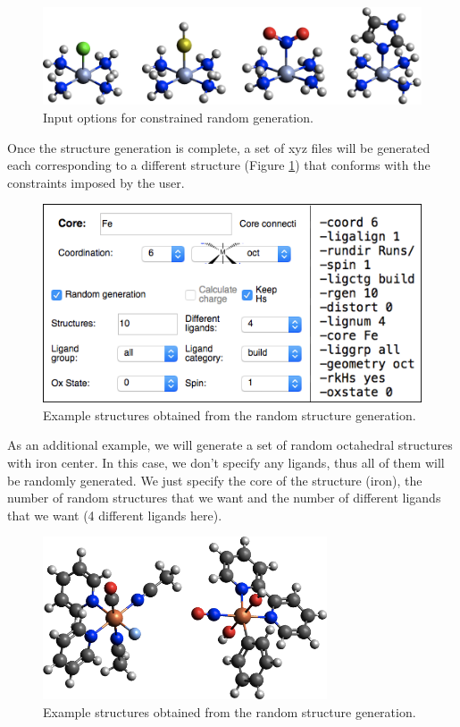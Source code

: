 \documentclass[a4paper,12pt]{assignment}
\begin{document}
\begin{figure}[htb!]
\centering
\includegraphics[width=\textwidth]{./Figures/fig8b.png}
\caption{Input options for constrained random generation.}
\label{ran1b}
\end{figure}

Once the structure generation is complete, a set of xyz files will be generated each corresponding to a different structure (Figure \ref{ran1b}) that conforms with the constraints imposed by the user.

\begin{figure}[htb!]
\centering
\includegraphics[width=\textwidth]{./Figures/fig9a.png}
\caption{Example structures obtained from the random structure generation.}
\label{ran2a}
\end{figure}

As an additional example, we will generate a set of random octahedral structures with iron center. In this case, we don't specify any ligands, thus all of them will be randomly generated. We just specify the core of the structure (iron), the number of random structures that we want and the number of different ligands that we want (4 different ligands here).

\begin{figure}[htb!]
\centering
\includegraphics[width=0.75\textwidth]{./Figures/fig9b.png}
\caption{Example structures obtained from the random structure generation.}
\label{ran2b}
\end{figure}
\end{document}
